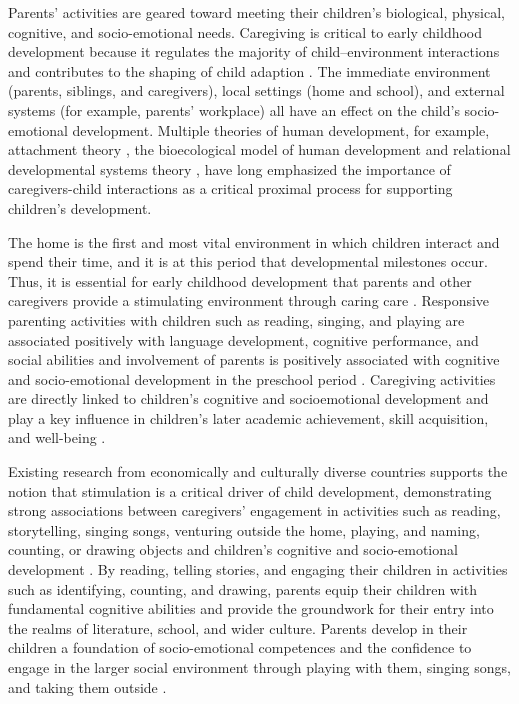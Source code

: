 \documentclass[
  12pt,
  oneside]{report}
\begin{document}
Parents' activities are geared toward meeting their children's biological, physical, cognitive, and socio-emotional needs. Caregiving is critical to early childhood development because it regulates the majority of child--environment interactions and contributes to the shaping of child adaption \citep{bornstein2006parenting}. The immediate environment (parents, siblings, and caregivers), local settings (home and school), and external systems (for example, parents' workplace) all have an effect on the child's socio-emotional development. Multiple theories of human development, for example, attachment theory \citep{bowlby1969attachment}, the bioecological model of human development \citep{bronfenbrenner2007bioecological} and relational developmental
systems theory \citep{overton2015processes}, have long emphasized the importance of caregivers-child interactions as a critical proximal process for supporting children's development.

The home is the first and most vital environment in which children interact and spend their time, and it is at this period that developmental milestones occur. Thus, it is essential for early childhood development that parents and other caregivers provide a stimulating environment through caring care \citep{black2017early}. Responsive parenting activities with children such as reading, singing, and playing are associated positively with language development, cognitive performance, and social abilities \citep{yousafzai2014effect} and involvement of parents is positively associated with cognitive and socio-emotional development in the preschool period \citep{maggi2010social}. Caregiving activities are directly linked to children's cognitive and socioemotional development and play a key influence in children's later academic achievement, skill acquisition, and well-being \citep{behrman2013economic}.

Existing research from economically and culturally diverse countries supports the notion that stimulation is a critical driver of child development, demonstrating strong associations between caregivers' engagement in activities such as reading, storytelling, singing songs, venturing outside the home, playing, and naming, counting, or drawing objects and children's cognitive and socio-emotional development \citep{jeong2017pathways, jeong2016paternal}. By reading, telling stories, and engaging their children in activities such as identifying, counting, and drawing, parents equip their children with fundamental cognitive abilities and provide the groundwork for their entry into the realms of literature, school, and wider culture. Parents develop in their children a foundation of socio-emotional competences and the confidence to engage in the larger social environment through playing with them, singing songs, and taking them outside \citep{bornstein2012cognitive}.
\end{document}
